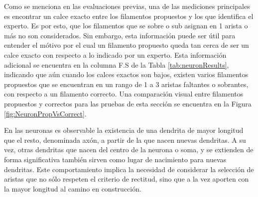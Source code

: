 Como se menciona en las evaluaciones previas, una de las mediciones principales es encontrar un calce exacto entre los filamentos propuestos y los que identifica el experto. Es por esto, que los filamentos que se sobre o sub asignan en 1 arista o m\'as no son considerados. Sin embargo, esta informaci\'on puede ser \'util para entender el m\'otivo por el cual un filamento propuesto queda tan cerca de ser un calce exacto con respecto a lo indicado por un experto. Esta informaci\'on adicional se encuentra en la columna F.S de la Tabla \ref{tab:neuronResults}, indicando que a\'un cuando los calces exactos son bajos, existen varios filamentos propuestos que se encuentran en un rango de 1 a 3 aristas faltantes o sobrantes, con respecto a un filamento correcto. Una comparaci\'on visual entre filamentos propuestos y correctos para las pruebas de esta secci\'on se encuentra en la Figura \ref{fig:NeuronPropVsCorrect}.

En las neuronas es observable la existencia de una dendrita de mayor longitud que el resto, denominada axón, a partir de la que nacen nuevas dendritas. A su vez, otras dendritas que nacen del centro de la neurona o soma, y se extienden de forma significativa tambi\'en sirven como lugar de nacimiento para nuevas dendritas. Este comportamiento implica la necesidad de considerar la selecci\'on de aristas que no s\'olo respeten el criterio de rectitud, sino que a la vez aporten con la mayor longitud al camino en construcci\'on.


